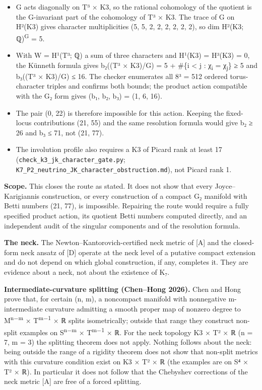 \documentclass[11pt,a4paper]{article}
\begin{document}
\begin{itemize}
\tightlist
\item
  G acts diagonally on T³ × K3, so the rational cohomology of the quotient is the G-invariant part of the cohomology of T³ × K3. The trace of G on H²(K3) gives character multiplicities (5, 5, 2, 2, 2, 2, 2, 2), so dim H²(K3; ℚ)\textsuperscript{G} = 5.
\item
  With W = H¹(T³; ℚ) a sum of three characters and H¹(K3) = H³(K3) = 0, the Künneth formula gives b₂((T³ × K3)/G) = 5 + \#\{i \textless{} j : χ\textsubscript{i} = χ\textsubscript{j}\} ≥ 5 and b₃((T³ × K3)/G) ≤ 16. The checker enumerates all 8³ = 512 ordered torus-character triples and confirms both bounds; the product action compatible with the G₂ form gives (b₁, b₂, b₃) = (1, 6, 16).
\item
  The pair (0, 22) is therefore impossible for this action. Keeping the fixed-locus contributions (21, 55) and the same resolution formula would give b₂ ≥ 26 and b₃ ≤ 71, not (21, 77).
\item
  The involution profile also requires a K3 of Picard rank at least 17 (\texttt{check\_\allowbreak{}k3\_\allowbreak{}jk\_\allowbreak{}character\_\allowbreak{}gate.\allowbreak{}py}; \texttt{K7\_\allowbreak{}P2\_\allowbreak{}neutrino\_\allowbreak{}JK\_\allowbreak{}character\_\allowbreak{}obstruction.\allowbreak{}md}), not Picard rank 1.
\end{itemize}

\textbf{Scope.} This closes the route as stated. It does not show that every Joyce--Karigiannis construction, or every construction of a compact G₂ manifold with Betti numbers (21, 77), is impossible. Repairing the route would require a fully specified product action, its quotient Betti numbers computed directly, and an independent audit of the singular components and of the resolution formula.

\textbf{The neck.} The Newton--Kantorovich-certified neck metric of {[}A{]} and the closed-form neck ansatz of {[}D{]} operate at the neck level of a putative compact extension and do not depend on which global construction, if any, completes it. They are evidence about a neck, not about the existence of K₇.

\textbf{Intermediate-curvature splitting (Chen--Hong 2026).} Chen and Hong \cite{48} prove that, for certain (n, m), a noncompact manifold with nonnegative m-intermediate curvature admitting a smooth proper map of nonzero degree to M\textsuperscript{n−m} × T\textsuperscript{m−1} × ℝ splits isometrically; outside that range they construct non-split examples on S\textsuperscript{n−m} × T\textsuperscript{m−1} × ℝ. For the neck topology K3 × T² × ℝ (n = 7, m = 3) the splitting theorem does not apply. Nothing follows about the neck: being outside the range of a rigidity theorem does not show that non-split metrics with this curvature condition exist on K3 × T² × ℝ (the examples are on S⁴ × T² × ℝ). In particular it does not follow that the Chebyshev corrections of the neck metric {[}A{]} are free of a forced splitting.
\end{document}
